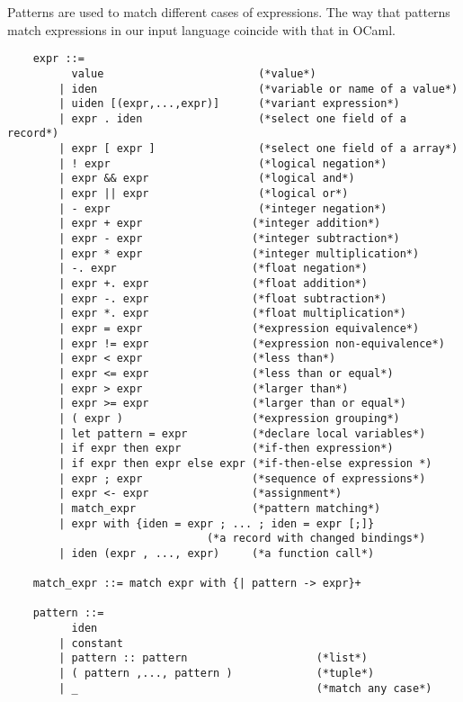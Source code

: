 Patterns are used to match different cases of expressions. The way that patterns match expressions in our input language coincide with that in OCaml.
\begin{center}
	\begin{verbatim}
	expr ::=
	      value                        (*value*)
	    | iden                         (*variable or name of a value*)
	    | uiden [(expr,...,expr)]      (*variant expression*)
	    | expr . iden                  (*select one field of a record*)
	    | expr [ expr ]                (*select one field of a array*)
	    | ! expr                       (*logical negation*)
	    | expr && expr                 (*logical and*)
	    | expr || expr                 (*logical or*)
	    | - expr                       (*integer negation*)
	    | expr + expr                 (*integer addition*)
	    | expr - expr                 (*integer subtraction*)
	    | expr * expr                 (*integer multiplication*)
	    | -. expr                     (*float negation*)
	    | expr +. expr                (*float addition*)
	    | expr -. expr                (*float subtraction*)
	    | expr *. expr                (*float multiplication*)
	    | expr = expr                 (*expression equivalence*)
	    | expr != expr                (*expression non-equivalence*)
	    | expr < expr                 (*less than*)
	    | expr <= expr                (*less than or equal*)
	    | expr > expr                 (*larger than*)
	    | expr >= expr                (*larger than or equal*)
	    | ( expr )                    (*expression grouping*)
	    | let pattern = expr          (*declare local variables*)
	    | if expr then expr           (*if-then expression*)
	    | if expr then expr else expr (*if-then-else expression *)
	    | expr ; expr                 (*sequence of expressions*)
	    | expr <- expr                (*assignment*)
	    | match_expr                  (*pattern matching*)
	    | expr with {iden = expr ; ... ; iden = expr [;]}  
	                           (*a record with changed bindings*)
	    | iden (expr , ..., expr)     (*a function call*)
	
	match_expr ::= match expr with {| pattern -> expr}+
	
	pattern ::= 
	      iden 
	    | constant
	    | pattern :: pattern                    (*list*)
	    | ( pattern ,..., pattern )             (*tuple*)
	    | _                                     (*match any case*)
	\end{verbatim}
\end{center}

